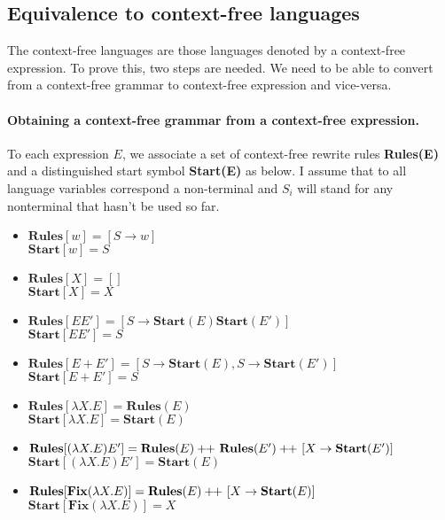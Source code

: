 \subsection{Equivalence to context-free languages}

The context-free languages are those languages denoted by a context-free expression. To prove this, two steps are needed. We need to be able to convert from a context-free grammar to context-free expression and vice-versa.

\paragraph*{Obtaining a context-free grammar from a context-free expression.} To each expression $E$, we associate a set of context-free rewrite rules \textbf{Rules(E)} and a distinguished start symbol \textbf{Start(E)} as below. I assume that to all language variables correspond a non-terminal and $S_i$ will stand for any nonterminal that hasn't be used so far.

\begin{itemize}
\item 
$\mathbf{Rules}[w] = [S\rightarrow w]$\\
$\mathbf{Start}[w] = S$
\item 
$\mathbf{Rules}[X] = []$\\
$\mathbf{Start}[X] = X$
\item 
$\mathbf{Rules}[EE'] = [S \rightarrow \mathbf{Start}(E)\mathbf{Start}(E')]$\\
$\mathbf{Start}[EE'] = S$
\item 
$\mathbf{Rules}[E + E'] = [S \rightarrow \mathbf{Start}(E), S\rightarrow\mathbf{Start}(E')]$\\
$\mathbf{Start}[E + E'] = S$
\item 
$\mathbf{Rules}[\lambda X. E] = \mathbf{Rules}(E)$\\
$\mathbf{Start}[\lambda X. E] = \mathbf{Start}(E)$
\item 
$\mathbf{Rules}[(\lambda X. E)E'] = \mathbf{Rules}(E) +\hspace{-3pt}+\ \mathbf{Rules}(E') +\hspace{-3pt}+\ [X\rightarrow \textbf{Start}(E')]$\\
$\mathbf{Start}[(\lambda X. E)E'] = \mathbf{Start}(E)$
\item 
$\mathbf{Rules}[\mathbf{Fix}(\lambda X. E)] = \mathbf{Rules}(E) +\hspace{-3pt}+\ [X\rightarrow \textbf{Start}(E)]$\\
$\mathbf{Start}[\mathbf{Fix}(\lambda X. E)] = X$
\end{itemize}

